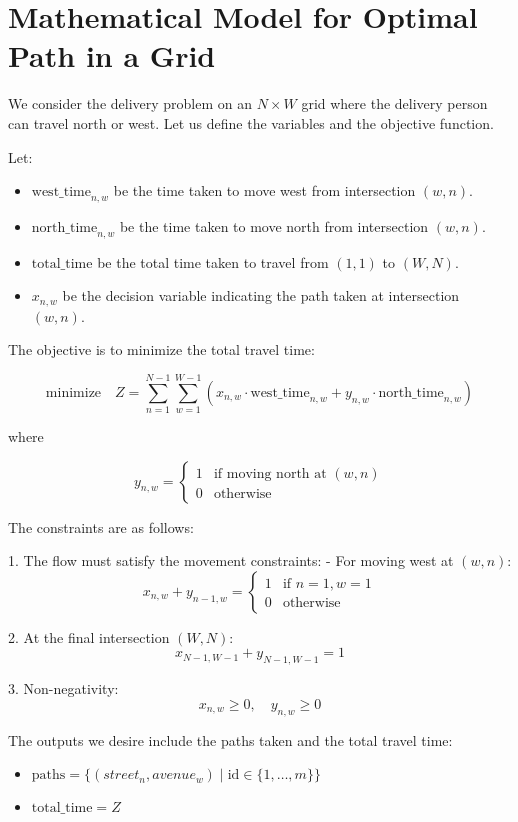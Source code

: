 \documentclass{article}
\begin{document}
\section*{Mathematical Model for Optimal Path in a Grid}

We consider the delivery problem on an \(N \times W\) grid where the delivery person can travel north or west. Let us define the variables and the objective function.

Let:

\begin{itemize}
    \item \( \text{west\_time}_{n,w} \) be the time taken to move west from intersection \( (w,n) \).
    \item \( \text{north\_time}_{n,w} \) be the time taken to move north from intersection \( (w,n) \).
    \item \( \text{total\_time} \) be the total time taken to travel from \( (1, 1) \) to \( (W, N) \).
    \item \( x_{n,w} \) be the decision variable indicating the path taken at intersection \( (w,n) \).
\end{itemize}

The objective is to minimize the total travel time:

\[
\text{minimize} \quad Z = \sum_{n=1}^{N-1} \sum_{w=1}^{W-1} \left( x_{n,w} \cdot \text{west\_time}_{n,w} + y_{n,w} \cdot \text{north\_time}_{n,w} \right)
\]

where 

\[
y_{n,w} = 
\begin{cases} 
1 & \text{if moving north at } (w,n) \\ 
0 & \text{otherwise} 
\end{cases} 
\]

The constraints are as follows:

1. The flow must satisfy the movement constraints:
   - For moving west at \( (w,n) \):
   \[
   x_{n,w} + y_{n-1,w} = 
   \begin{cases} 
   1 & \text{if } n = 1, w = 1 \\ 
   0 & \text{otherwise}
   \end{cases}
   \]

2. At the final intersection \( (W,N) \):
   \[
   x_{N-1,W-1} + y_{N-1,W-1} = 1
   \]

3. Non-negativity:
\[
x_{n,w} \geq 0, \quad y_{n,w} \geq 0
\]

The outputs we desire include the paths taken and the total travel time:

\begin{itemize}
    \item \( \text{paths} = \{ (street_{n}, avenue_{w}) \; | \; \text{id} \in \{1, \ldots, m\} \} \)
    \item \( \text{total\_time} = Z \)
\end{itemize}
\end{document}
